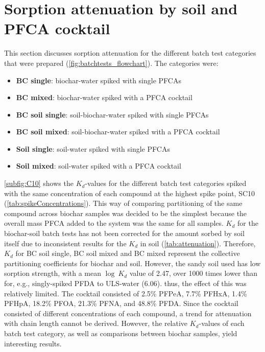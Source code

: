 
\section{Sorption attenuation by soil and PFCA cocktail}
This section discusses sorption attenuation for the different batch test categories that were prepared (\cref{fig:batchtests_flowchart}). The categories were: 

\begin{itemize}
    \item \textbf{BC single}: biochar-water spiked with single PFCAs
    \item \textbf{BC mixed}: biochar-water spiked with a PFCA cocktail
    \item \textbf{BC soil single}: soil-biochar-water spiked with single PFCAs
    \item \textbf{BC soil mixed}: soil-biochar-water spiked with a PFCA cocktail
    \item \textbf{Soil single}: soil-water spiked with single PFCAs
    \item \textbf{Soil mixed}: soil-water spiked with a PFCA cocktail
\end{itemize}

\cref{subfig:C10} shows the $K_d$-values for the different batch test categories spiked with the same concentration of each compound at the highest spike point, SC10 (\cref{tab:spikeConcentrations}). This way of comparing partitioning of the same compound across biochar samples was decided to be the simplest because the overall mass PFCA added to the system was the same for all samples. $K_d$ for the biochar-soil batch tests has not been corrected for the amount sorbed by soil itself due to inconsistent results for the $K_d$ in soil (\cref{tab:attenuation}). Therefore, $K_d$ for BC soil single, BC soil mixed and BC mixed represent the collective partitioning coefficients for biochar and soil. However, the sandy soil used has low sorption strength, with a mean $\log~K_d$ value of 2.47, over 1000 times lower than for, e.g., singly-spiked PFDA to ULS-water (6.06). thus, the effect of this was relatively limited. The cocktail consisted of 2.5\% PFPeA, 7.7\% PFHxA, 1.4\% PFHpA, 18.2\% PFOA, 21.3\% PFNA, and 48.8\% PFDA. Since the cocktail consisted of different concentrations of each compound, a trend for attenuation with chain length cannot be derived. However, the relative $K_d$-values of each batch test category, as well as comparisons between biochar samples, yield interesting results. 

